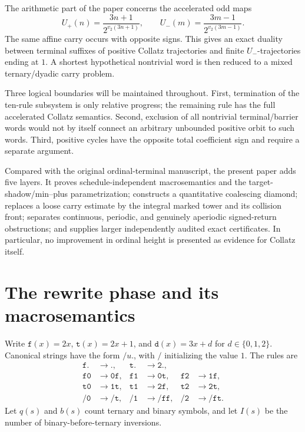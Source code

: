 \documentclass[11pt,reqno]{amsart}
\theoremstyle{remark}
\newcommand{\Up}{U_{+}}
\newcommand{\Um}{U_{-}}
\newcommand{\vtwo}{v_2}
\begin{document}
The arithmetic part of the paper concerns the accelerated odd maps
\[
 \Up(n)=\frac{3n+1}{2^{\vtwo(3n+1)}},\qquad
 \Um(m)=\frac{3m-1}{2^{\vtwo(3m-1)}}.
\]
The same affine carry occurs with opposite signs.  This gives an exact duality
between terminal suffixes of positive Collatz trajectories and finite
$\Um$-trajectories ending at $1$.  A shortest hypothetical nontrivial word is
then reduced to a mixed ternary/dyadic carry problem.

Three logical boundaries will be maintained throughout.  First, termination
of the ten-rule subsystem is only relative progress; the remaining rule has
the full accelerated Collatz semantics.  Second, exclusion of all nontrivial
terminal/barrier words would not by itself connect an arbitrary unbounded
positive orbit to such words.  Third, positive cycles have the opposite total
coefficient sign and require a separate argument.

Compared with the original ordinal-terminal manuscript, the present paper
adds five layers.  It proves schedule-independent macrosemantics and the
target-shadow/min--plus parametrization; constructs a quantitative coalescing
diamond; replaces a loose carry estimate by the integral marked tower and its
collision front; separates continuous, periodic, and genuinely aperiodic
signed-return obstructions; and supplies larger independently audited exact
certificates.  In particular, no improvement in ordinal height is presented
as evidence for Collatz itself.

\section{The rewrite phase and its macrosemantics}

Write $\mathtt f(x)=2x$, $\mathtt t(x)=2x+1$, and
$\mathtt d(x)=3x+d$ for $d\in\{0,1,2\}$.  Canonical strings have the form
$\mathtt{/}u\mathtt{.}$, with $\mathtt{/}$ initializing the value $1$.
The rules are
\begin{align*}
 \mathtt{f.}&\to\mathtt{.},&\mathtt{t.}&\to\mathtt{2.},\\
 \mathtt{f0}&\to\mathtt{0f},&\mathtt{f1}&\to\mathtt{0t},&
 \mathtt{f2}&\to\mathtt{1f},\\
 \mathtt{t0}&\to\mathtt{1t},&\mathtt{t1}&\to\mathtt{2f},&
 \mathtt{t2}&\to\mathtt{2t},\\
 \mathtt{/0}&\to\mathtt{/t},&\mathtt{/1}&\to\mathtt{/ff},&
 \mathtt{/2}&\to\mathtt{/ft}.
\end{align*}
Let $q(s)$ and $b(s)$ count ternary and binary symbols, and let $I(s)$ be
the number of binary-before-ternary inversions.
\end{document}
